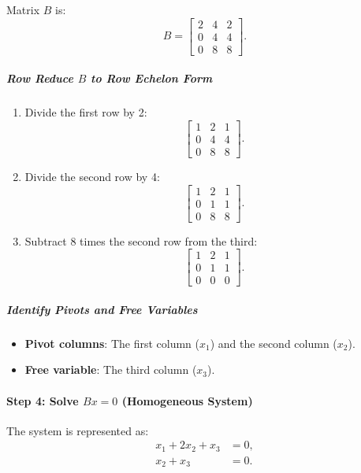 \documentclass[11pt]{article}
\providecommand{\tightlist}{%
      \setlength{\itemsep}{0pt}\setlength{\parskip}{0pt}}
\begin{document}
Matrix \(B\) is: \[
B = 
\begin{bmatrix}
2 & 4 & 2 \\
0 & 4 & 4 \\
0 & 8 & 8
\end{bmatrix}.
\]

\subparagraph{\texorpdfstring{Row Reduce \(B\) to Row Echelon
Form}{Row Reduce B to Row Echelon Form}}\label{row-reduce-b-to-row-echelon-form}

\begin{enumerate}
\def\labelenumi{\arabic{enumi}.}
\item
  Divide the first row by 2: \[
  \begin{bmatrix}
  1 & 2 & 1 \\
  0 & 4 & 4 \\
  0 & 8 & 8
  \end{bmatrix}.
  \]
\item
  Divide the second row by 4: \[
  \begin{bmatrix}
  1 & 2 & 1 \\
  0 & 1 & 1 \\
  0 & 8 & 8
  \end{bmatrix}.
  \]
\item
  Subtract 8 times the second row from the third: \[
  \begin{bmatrix}
  1 & 2 & 1 \\
  0 & 1 & 1 \\
  0 & 0 & 0
  \end{bmatrix}.
  \]
\end{enumerate}

\subparagraph{Identify Pivots and Free
Variables}\label{identify-pivots-and-free-variables-1}

\begin{itemize}
\tightlist
\item
  \textbf{Pivot columns}: The first column (\(x_1\)) and the second
  column (\(x_2\)).
\item
  \textbf{Free variable}: The third column (\(x_3\)).
\end{itemize}

\paragraph{\texorpdfstring{Step 4: Solve \(Bx = 0\) (Homogeneous
System)}{Step 4: Solve Bx = 0 (Homogeneous System)}}\label{step-4-solve-bx-0-homogeneous-system}

The system is represented as: \[
\begin{aligned}
x_1 + 2x_2 + x_3 &= 0, \\
x_2 + x_3 &= 0.
\end{aligned}
\]
\end{document}
